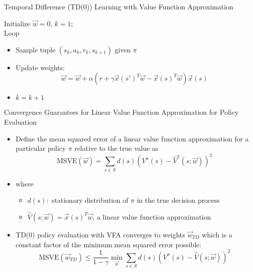 \documentclass[aspectratio=169]{../latex_main/tntbeamer}  %
\begin{document}
\begin{frame}[c]{Temporal Difference (TD(0)) Learning with Value
		Function Approximation}

Initialize $\vec{w}= 0$, $k=1$;\\
Loop
	\begin{itemize}
		\item Sample tuple $(s_k, a_k, r_k, s_{k+1})$ given $\pi$
		\item Update weights:
		$$ \vec{w} = \vec{w} + \alpha( r + \gamma \vec{x}(s')^T \vec{w} - \vec{x}(s)^T\vec{w}) \vec{x}(s) $$
		\item $k = k + 1$
	\end{itemize}

\end{frame}
\begin{frame}[c]{Convergence Guarantees for Linear Value Function
		Approximation for Policy Evaluation}
	
\begin{itemize}
	\item Define the mean squared error of a linear value function
	approximation for a particular policy $\pi$ relative to the true value as
	$$\text{MSVE}(\vec{w}) = \sum_{s\in S} d(s) (V^\pi(s) - \hat{V}^\pi (s;\vec{w}))^2$$
	\item where
	\begin{itemize}
		\item $d(s):$ stationary distribution of $\pi$ in the true decision process
		\item $\hat{V}(s;\vec{w}) = \vec{x}(s)^T \vec{w}$, a linear value function approximation
	\end{itemize}
	\item TD(0) policy evaluation with VFA converges to weights $\vec{w}_{TD}$ which is a constant factor of the minimum mean squared error possible:
	$$\text{MSVE}(\vec{w}_{TD}) \leq \frac{1}{1-\gamma} \min_\vec{w}\sum_{s\in S} d(s) (V^\pi(s) - \hat{V}(s;\vec{w}))^2$$
\end{itemize}

	
\end{frame}
\end{document}
